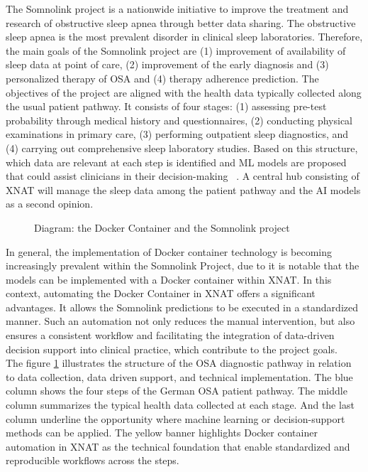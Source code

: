 The Somnolink project is a nationwide initiative to improve the treatment and research of obstructive sleep apnea through better data sharing. The obstructive sleep apnea is the most prevalent disorder in clinical sleep laboratories. Therefore, the main goals of the Somnolink project are (1) improvement of availability of sleep data at point of care, (2) improvement of the early diagnosis and (3) personalized therapy of OSA and (4) therapy adherence prediction.
The objectives of the project are aligned with the health data typically collected along the usual patient pathway. It consists of four stages: (1) assessing pre-test probability through medical history and questionnaires, (2) conducting physical examinations in primary care, (3) performing outpatient sleep diagnostics, and (4) carrying out comprehensive sleep laboratory studies. Based on this structure, which data are relevant at each step is identified and ML models are proposed that could assist clinicians in their decision-making ~\cite{krefting_somnolink_2025}. A central hub consisting of XNAT will manage the sleep data among the patient pathway and the AI models as a second opinion.
\begin{figure}[H]
    \centering
    \def\svgwidth{\linewidth} 
    
    \caption{Diagram: the Docker Container and the Somnolink project}
    \label{fig:somnolink}
\end{figure}

In general, the implementation of Docker container technology is becoming increasingly prevalent within the Somnolink Project, due to it is notable that the models can be implemented with a Docker container within XNAT.
In this context, automating the Docker Container in XNAT offers a significant advantages. It allows the Somnolink predictions to be executed in a standardized manner. Such an automation not only reduces the manual intervention, but also ensures a consistent  workflow and facilitating the integration of data-driven decision support into clinical practice, which contribute to the project goals.\\
The figure \ref{fig:somnolink} illustrates the structure of the OSA diagnostic pathway in relation to data collection, data driven support, and technical implementation.
The blue column shows the four steps of the German OSA patient pathway. The middle column summarizes the typical health data collected at each stage. And the last column underline the opportunity where machine learning or decision-support methods can be applied. 
The yellow banner highlights Docker container automation in XNAT  as the technical foundation that enable standardized and reproducible workflows across the steps.

